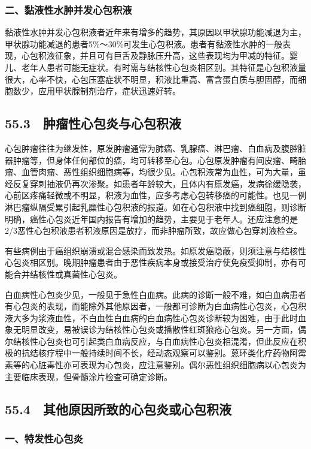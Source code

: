 \subsubsection{二、黏液性水肿并发心包积液}

黏液性水肿并发心包积液者近年来有增多的趋势，其原因以甲状腺功能减退为主，甲状腺功能减退的患者5\%～30\%可发生心包积液。患者有黏液性水肿的一般表现，心包积液征象，并且可有巨舌及静脉压升高，这些表现均为甲减的特征。婴儿、老年人患者可能无症状。有时需与结核性心包炎相区别。其特征是心包积液量很大，心率不快，心包压塞症状不明显，积液比重高、富含蛋白质与胆固醇，而细胞数少，应用甲状腺制剂治疗，症状迅速好转。

\subsection{55.3　肿瘤性心包炎与心包积液}

心包肿瘤往往为继发性，原发肿瘤通常为肺癌、乳腺癌、淋巴瘤、白血病及腹腔脏器肿瘤等，但身体任何部位的癌，均可转移至心包。心包原发肿瘤有间皮瘤、畸胎瘤、血管肉瘤、恶性组织细胞病等，均很少见。心包积液常为血性，可为大量，虽经反复穿刺抽液仍再次渗聚。如患者年龄较大，且体内有原发癌，发病徐缓隐袭，心前区疼痛轻微或不明显，积液为血性，应多考虑心包转移癌的可能性。也见一例淋巴瘤纵隔受累引起乳糜性心包积液的报道。如在心包积液中找到癌细胞，则诊断明确，癌性心包炎近年国内报告有增加的趋势，主要见于老年人。还应注意的是2/3恶性心包积液患者积液原因是放疗，而非肿瘤所致，故应做心包穿刺液检查。

有些病例由于癌组织崩溃或混合感染而致发热。如原发癌隐蔽，则须注意与结核性心包炎相区别。晚期肿瘤患者由于恶性疾病本身或接受治疗使免疫受抑制，亦有可能合并结核性或真菌性心包炎。

白血病性心包炎少见，一般见于急性白血病。此病的诊断一般不难，如白血病患者有心包炎的表现，而能除外其他原因者，一般都可诊断为白血病性心包炎，心包积液大多为浆液血性，不白血性白血病的白血病性心包炎诊断较为困难，由于此时血象无明显改变，易被误诊为结核性心包炎或播散性红斑狼疮心包炎。另一方面，偶尔结核性心包炎也可引起类白血病反应，与白血病性心包炎相混淆，但此反应在积极的抗结核疗程中一般持续时间不长，经动态观察可以鉴别。蒽环类化疗药物阿霉素等的心脏毒性亦可表现为心包炎，应注意鉴别。偶尔恶性组织细胞病以心包炎为主要临床表现，但骨髓涂片检查可确定诊断。

\subsection{55.4　其他原因所致的心包炎或心包积液}

\subsubsection{一、特发性心包炎}

